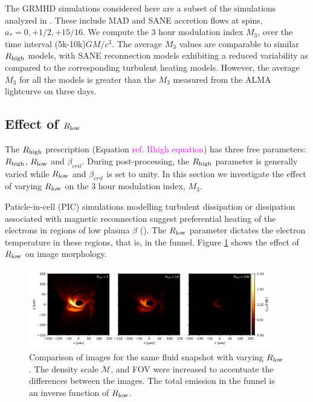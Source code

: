 The GRMHD simulations considered here are a subset of the simulations analyzed in \citealt{2020MNRAS.494.4168D}. These include MAD and SANE accretion flows at spins, $a_{*}=0,+1/2,+15/16$. We compute the 3 hour modulation index $M_{3}$, over the time interval (5k-10k)$GM/c^{3}$. The average $M_{3}$ values are comparable to similar $R_\mathrm{high}$ models, with SANE reconnection models exhibiting a reduced variability as compared to the corresponding turbulent heating models. However, the average $M_{3}$ for all the models is greater than the $M_{3}$ measured from the ALMA lightcurve on three days.

\subsection{Effect of $R_\mathrm{low}$}

The $R_\mathrm{high}$ prescription (Equation \textcolor{magenta}{ref. Rhigh equation}) has three free parameters: $R_\mathrm{high}$, $R_\mathrm{low}$ and $\beta_{crit}$. During post-processing, the $R_\mathrm{high}$ parameter is generally varied while $R_\mathrm{low}$ and $\beta_{crit}$ is set to unity. In this section we investigate the effect of varying $R_\mathrm{low}$ on the 3 hour modulation index, $M_{3}$.

Paticle-in-cell (PIC) simulations modelling turbulent dissipation or dissipation associated with magnetic reconnection suggest preferential heating of the electrons in regions of low plasma $\beta$ (\citealt{2010MNRAS.409L.104H, Rowan_2017, 10.1093/mnras/stx2530, Rowan_2019, Kawazura771, PhysRevX.10.041050, kawazura2021energy}). The $R_\mathrm{low}$ parameter dictates the electron temperature in these regions, that is, in the funnel. Figure \ref{fig:rlow_comparison} shows the effect of $R_\mathrm{low}$ on image morphology.

\begin{figure}
\centering
\includegraphics[width=0.95\textwidth]{figures/rlow_comparison_rhigh160.png}
\caption{Comparison of images for the same fluid snapshot with varying $R_\mathrm{low}$. The density scale $\mathcal{M}$, and FOV were increased to accentuate the differences between the images. The total emission in the funnel is an inverse function of $R_\mathrm{low}$.}
\label{fig:rlow_comparison}
\end{figure}

